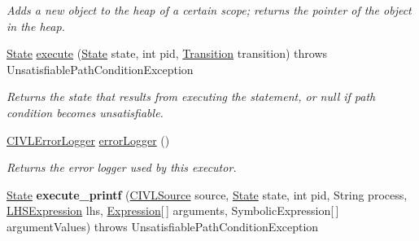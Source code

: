 \begin{DoxyCompactItemize}
\begin{DoxyCompactList}\small\item\em Adds a new object to the heap of a certain scope; returns the pointer of the object in the heap. \end{DoxyCompactList}\item 
\hyperlink{interfaceedu_1_1udel_1_1cis_1_1vsl_1_1civl_1_1state_1_1IF_1_1State}{State} \hyperlink{interfaceedu_1_1udel_1_1cis_1_1vsl_1_1civl_1_1semantics_1_1IF_1_1Executor_ac036070596258e5ccf9320a03a0ef77f}{execute} (\hyperlink{interfaceedu_1_1udel_1_1cis_1_1vsl_1_1civl_1_1state_1_1IF_1_1State}{State} state, int pid, \hyperlink{interfaceedu_1_1udel_1_1cis_1_1vsl_1_1civl_1_1semantics_1_1IF_1_1Transition}{Transition} transition)  throws Unsatisfiable\+Path\+Condition\+Exception
\begin{DoxyCompactList}\small\item\em Returns the state that results from executing the statement, or null if path condition becomes unsatisfiable. \end{DoxyCompactList}\item 
\hyperlink{classedu_1_1udel_1_1cis_1_1vsl_1_1civl_1_1log_1_1IF_1_1CIVLErrorLogger}{C\+I\+V\+L\+Error\+Logger} \hyperlink{interfaceedu_1_1udel_1_1cis_1_1vsl_1_1civl_1_1semantics_1_1IF_1_1Executor_a4e6b5f093b821573e729d68f4f241f32}{error\+Logger} ()
\begin{DoxyCompactList}\small\item\em Returns the error logger used by this executor. \end{DoxyCompactList}\item 
\hypertarget{interfaceedu_1_1udel_1_1cis_1_1vsl_1_1civl_1_1semantics_1_1IF_1_1Executor_a1936720866aede66359cd013355453a7}{}\hyperlink{interfaceedu_1_1udel_1_1cis_1_1vsl_1_1civl_1_1state_1_1IF_1_1State}{State} {\bfseries execute\+\_\+printf} (\hyperlink{interfaceedu_1_1udel_1_1cis_1_1vsl_1_1civl_1_1model_1_1IF_1_1CIVLSource}{C\+I\+V\+L\+Source} source, \hyperlink{interfaceedu_1_1udel_1_1cis_1_1vsl_1_1civl_1_1state_1_1IF_1_1State}{State} state, int pid, String process, \hyperlink{interfaceedu_1_1udel_1_1cis_1_1vsl_1_1civl_1_1model_1_1IF_1_1expression_1_1LHSExpression}{L\+H\+S\+Expression} lhs, \hyperlink{interfaceedu_1_1udel_1_1cis_1_1vsl_1_1civl_1_1model_1_1IF_1_1expression_1_1Expression}{Expression}\mbox{[}$\,$\mbox{]} arguments, Symbolic\+Expression\mbox{[}$\,$\mbox{]} argument\+Values)  throws Unsatisfiable\+Path\+Condition\+Exception\label{interfaceedu_1_1udel_1_1cis_1_1vsl_1_1civl_1_1semantics_1_1IF_1_1Executor_a1936720866aede66359cd013355453a7}


\end{DoxyCompactItemize}
